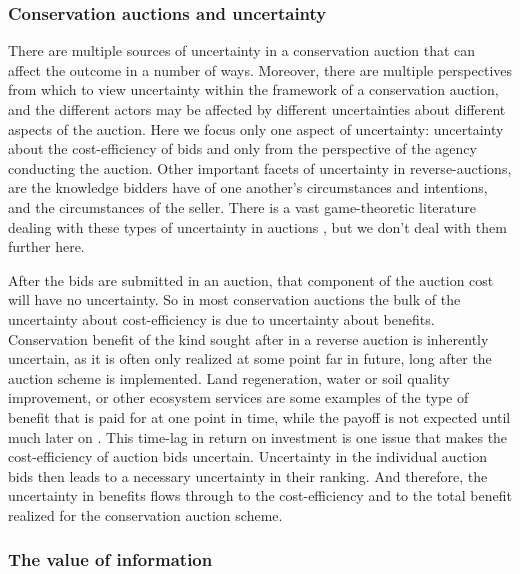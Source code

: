 \documentclass[]{article}
\theoremstyle{definition}
\theoremstyle{definition}
\theoremstyle{remark}
\begin{document}
\subsubsection*{Conservation auctions and
uncertainty}\label{conservation-auctions-and-uncertainty}

There are multiple sources of uncertainty in a conservation auction that
can affect the outcome in a number of ways. Moreover, there are multiple
perspectives from which to view uncertainty within the framework of a
conservation auction, and the different actors may be affected by
different uncertainties about different aspects of the auction. Here we
focus only one aspect of uncertainty: uncertainty about the
cost-efficiency of bids and only from the perspective of the agency
conducting the auction. Other important facets of uncertainty in
reverse-auctions, are the knowledge bidders have of one another's
circumstances and intentions, and the circumstances of the seller. There
is a vast game-theoretic literature dealing with these types of
uncertainty in auctions \citep[see for example][]{Hailu2004}, but we
don't deal with them further here.

After the bids are submitted in an auction, that component of the
auction cost will have no uncertainty. So in most conservation auctions
the bulk of the uncertainty about cost-efficiency is due to uncertainty
about benefits. Conservation benefit of the kind sought after in a
reverse auction is inherently uncertain, as it is often only realized at
some point far in future, long after the auction scheme is implemented.
Land regeneration, water or soil quality improvement, or other ecosystem
services are some examples of the type of benefit that is paid for at
one point in time, while the payoff is not expected until much later on
\citep{Vesk2008}. This time-lag in return on investment is one issue
that makes the cost-efficiency of auction bids uncertain. Uncertainty in
the individual auction bids then leads to a necessary uncertainty in
their ranking. And therefore, the uncertainty in benefits flows through
to the cost-efficiency and to the total benefit realized for the
conservation auction scheme.

\subsubsection*{The value of
information}\label{the-value-of-information}
\end{document}
